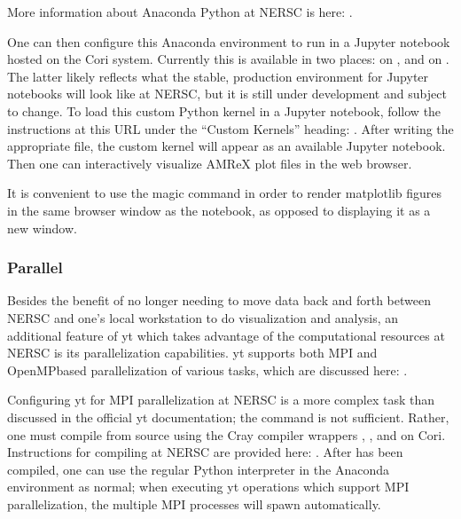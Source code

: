 \documentclass[letterpaper,10pt,english]{sphinxmanual}
\begin{document}
\sphinxAtStartPar
More information about Anaconda Python at NERSC is here:
.

\sphinxAtStartPar
One can then configure this Anaconda environment to run in a Jupyter notebook
hosted on the Cori system. Currently this is available in two places: on
, and on .  The latter
likely reflects what the stable, production environment for Jupyter notebooks
will look like at NERSC, but it is still under development and subject to
change. To load this custom Python kernel in a Jupyter notebook, follow the
instructions at this URL under the “Custom Kernels” heading:
.
After writing the appropriate  file, the custom kernel will
appear as an available Jupyter notebook. Then one can interactively visualize
AMReX plot files in the web browser. \sphinxstepexplicit %
\begin{footnote}[1]\label{\thesphinxscope.1}%
\sphinxAtStartFootnote
It is convenient to use the
magic command  in order to render matplotlib
figures in the same browser window as the notebook, as opposed to displaying it
as a new window.
%
\end{footnote}


\subsubsection{Parallel}
\label{\detokenize{Visualization:parallel}}
\sphinxAtStartPar
Besides the benefit of no longer needing to move data back and forth between
NERSC and one’s local workstation to do visualization and analysis, an
additional feature of yt which takes advantage of the computational resources
at NERSC is its parallelization capabilities. yt supports both MPI\sphinxhyphen{} and
OpenMP\sphinxhyphen{}based parallelization of various tasks, which are discussed here:
.

\sphinxAtStartPar
Configuring yt for MPI parallelization at NERSC is a more complex task than
discussed in the official yt documentation; the command 
is not sufficient. Rather, one must compile  from source using the
Cray compiler wrappers , , and  on Cori. Instructions for
compiling  at NERSC are provided here:
.
After  has been compiled, one can use the regular Python interpreter
in the Anaconda environment as normal; when executing yt operations which
support MPI parallelization, the multiple MPI processes will spawn
automatically.
\end{document}
